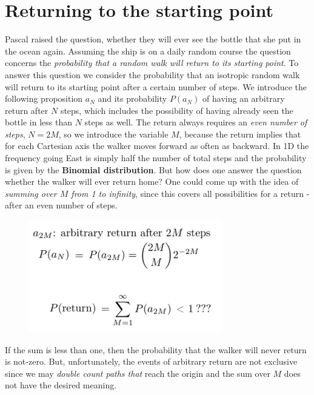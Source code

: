 \documentclass[12pt, a4paper]{scrartcl}
\begin{document}
\section*{Returning to the starting point}
Pascal raised the question, whether they will ever see the bottle that she put in the ocean again.
Assuming the ship is on a daily random course the question concerns the\textit{ probability that a random walk will return to its starting point}. 
To answer this question we consider the probability that an isotropic random walk will return to its starting point after a certain number of steps.
We introduce the following proposition $a_N$ and its probability $P(a_N)$ of having an arbitrary return after $N$ steps, which includes the possibility of having already seen the bottle in less than $N$ steps as well.
The return always requires an \textit{even number of steps}, $N=2M$, so we introduce the variable $M$, because the return implies that for each Cartesian axis the walker moves forward as often as backward.
In 1D the frequency going East is simply half the number of total steps and the probability is given by the \textbf{Binomial distribution}.
But how does one answer the question whether the walker will ever return home? One could come up with the idea of \textit{summing over $M$ from 1 to infinity}, since this covers all possibilities for a return - after an even number of steps. %
 \begin{figure}[H]
	\centering
	\includegraphics[width=0.75\textwidth]{5_5.png}
\end{figure}
If the sum is less than one, then the probability that the walker will never return is not-zero.
But, unfortunately, the events of arbitrary return are not exclusive since we may \textit{double count paths that} reach the origin and the sum over $M$ does not have the desired meaning.\\
\end{document}
